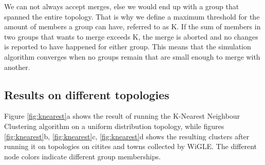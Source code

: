We can not always accept merges, else we would end up with a group that spanned the entire topology. That is why we define a maximum threshold for the amount of members a group can have, 
referred to as K. If the sum of members in two groups that wants to merge exceeds K, the merge is aborted and no changes is reported to have happened for either group. 
This means that the simulation algorithm converges when no groups remain that are small enough to merge with another.
 
\subsection{Results on different topologies}
Figure \ref{fig:knearest}a shows the result of running the K-Nearest Neighbour Clustering algorithm on a uniform distribution topology, while figures \ref{fig:knearest}b, \ref{fig:knearest}c, \ref{fig:knearest}d shows the resulting clusters after running it on topologies on citites and towns collected by WiGLE. The different node colors indicate different group memberships.


